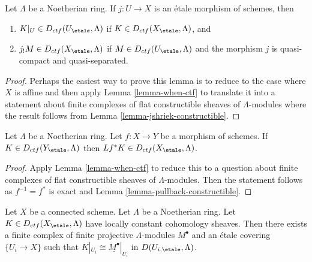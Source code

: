 \begin{lemma}
\label{lemma-restrict-and-shriek-from-etale-ctf}
Let $\Lambda$ be a Noetherian ring.
If $j : U \to X$ is an \'etale morphism of schemes, then
\begin{enumerate}
\item $K|_U \in D_{ctf}(U_\etale, \Lambda)$ if
$K \in D_{ctf}(X_\etale, \Lambda)$, and
\item $j_!M \in D_{ctf}(X_\etale, \Lambda)$ if
$M \in D_{ctf}(U_\etale, \Lambda)$ and
the morphism $j$ is quasi-compact and quasi-separated.
\end{enumerate}
\end{lemma}

\begin{proof}
Perhaps the easiest way to prove this lemma is to reduce to the
case where $X$ is affine and then apply Lemma \ref{lemma-when-ctf}
to translate it into a statement about finite complexes
of flat constructible sheaves of $\Lambda$-modules
where the result follows from Lemma \ref{lemma-jshriek-constructible}.
\end{proof}

\begin{lemma}
\label{lemma-pullback-ctf}
Let $\Lambda$ be a Noetherian ring. Let $f : X \to Y$ be a morphism of schemes.
If $K \in D_{ctf}(Y_\etale, \Lambda)$ then
$Lf^*K \in D_{ctf}(X_\etale, \Lambda)$.
\end{lemma}

\begin{proof}
Apply Lemma \ref{lemma-when-ctf} to reduce this to a question
about finite complexes of flat constructible sheaves of $\Lambda$-modules.
Then the statement follows as $f^{-1} = f^*$ is exact and
Lemma \ref{lemma-pullback-constructible}.
\end{proof}

\begin{lemma}
\label{lemma-connected-ctf-locally-constant}
Let $X$ be a connected scheme. Let $\Lambda$ be a Noetherian ring.
Let $K \in D_{ctf}(X_\etale, \Lambda)$ have locally constant cohomology sheaves.
Then there exists a finite complex of finite projective $\Lambda$-modules
$M^\bullet$ and an \'etale covering $\{U_i \to X\}$ such that
$K|_{U_i} \cong \underline{M^\bullet}|_{U_i}$ in $D(U_{i, \etale}, \Lambda)$.
\end{lemma}

